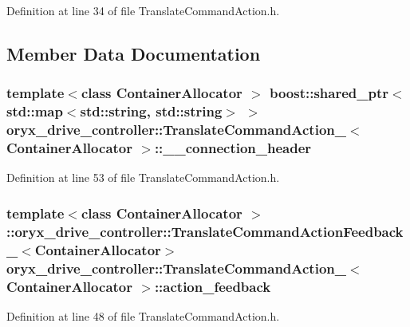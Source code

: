 \-Definition at line 34 of file \-Translate\-Command\-Action.\-h.



\subsection{\-Member \-Data \-Documentation}
\subsubsection[{\-\_\-\-\_\-connection\-\_\-header}]{\setlength{\rightskip}{0pt plus 5cm}template$<$class Container\-Allocator $>$ boost\-::shared\-\_\-ptr$<$std\-::map$<$std\-::string, std\-::string$>$ $>$ {\bf oryx\-\_\-drive\-\_\-controller\-::\-Translate\-Command\-Action\-\_\-}$<$ \-Container\-Allocator $>$\-::{\bf \-\_\-\-\_\-connection\-\_\-header}}\label{structoryx__drive__controller_1_1TranslateCommandAction___ab735671af7ee6b2dbadff01ac1bbfd8c}


\-Definition at line 53 of file \-Translate\-Command\-Action.\-h.

\subsubsection[{action\-\_\-feedback}]{\setlength{\rightskip}{0pt plus 5cm}template$<$class Container\-Allocator $>$ \-::{\bf oryx\-\_\-drive\-\_\-controller\-::\-Translate\-Command\-Action\-Feedback\-\_\-}$<$\-Container\-Allocator$>$ {\bf oryx\-\_\-drive\-\_\-controller\-::\-Translate\-Command\-Action\-\_\-}$<$ \-Container\-Allocator $>$\-::{\bf action\-\_\-feedback}}\label{structoryx__drive__controller_1_1TranslateCommandAction___a34895338f62199e80f8906fda686dab6}


\-Definition at line 48 of file \-Translate\-Command\-Action.\-h.

